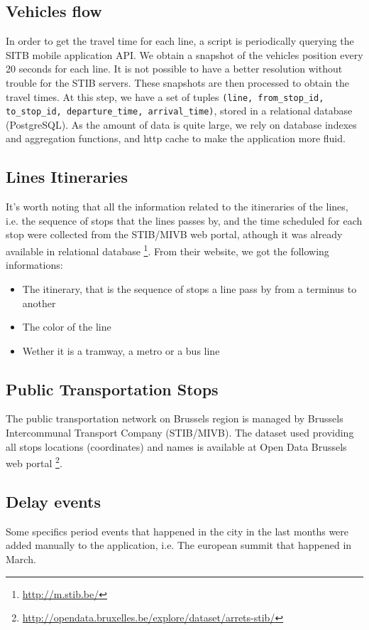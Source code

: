 \documentclass[11pt]{article}%
\begin{document}
\begin{minipage}{0.7\textwidth}
  \subsection{Vehicles flow}
  In order to get the travel time for each line, a script is periodically querying the SITB mobile application API. We obtain a snapshot of the vehicles position every 20 seconds for each line. It is not possible to have a better resolution without trouble for the STIB servers. These snapshots are then processed to obtain the travel times. At this step, we have a set of tuples \texttt{(line, from\_stop\_id, to\_stop\_id, departure\_time, arrival\_time)}, stored in a relational database (PostgreSQL). As the amount of data is quite large, we rely on database indexes and aggregation functions, and http cache to make the application more fluid.

  \subsection{Lines Itineraries}
  It's worth noting that all the information related to the itineraries of the lines, i.e. the sequence of stops that the lines passes by, and the time scheduled for each stop were collected from the STIB/MIVB web portal, athough it was already available in relational database \footnote{\url{http://m.stib.be/}}. From their website, we got the following informations:
  \begin{itemize}
      \item The itinerary, that is the sequence of stops a line pass by from a terminus to another
      \item The color of the line
      \item Wether it is a tramway, a metro or a bus line
  \end{itemize}
\end{minipage}

\subsection{Public Transportation Stops}
The public transportation network on Brussels region is managed by Brussels Intercommunal Transport Company (STIB/MIVB). The dataset used providing all stops locations (coordinates) and names is available at Open Data Brussels web portal \footnote{\url{http://opendata.bruxelles.be/explore/dataset/arrets-stib/}}.

\subsection{Delay events}
Some specifics period events that happened in the city in the last months were added manually to the application, i.e. The european summit that happened in March.                       
                       
\end{document}
